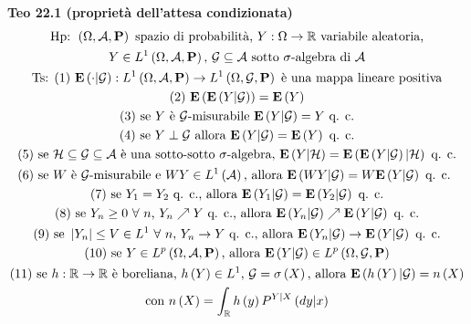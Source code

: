 \documentclass{article}
\begin{document}
\textbf{Teo 22.1 (propriet\`{a} dell'attesa condizionata)}%
\begin{gather*}
\text{Hp: }\left( \Omega ,\mathcal{A},\mathbf{P}\right) \text{ spazio di
probabilit\`{a}, }Y:\Omega \rightarrow 
\mathbb{R}
\text{ variabile aleatoria,} \\
Y\in L^{1}\left( \Omega ,\mathcal{A},\mathbf{P}\right) \text{, }\mathcal{%
G\subseteq A}\text{ sotto }\sigma \text{-algebra di }\mathcal{A} \\
\text{Ts: (1) }\mathbf{E}\left( \cdot |\mathcal{G}\right) :L^{1}\left(
\Omega ,\mathcal{A},\mathbf{P}\right) \rightarrow L^{1}\left( \Omega ,%
\mathcal{G},\mathbf{P}\right) \text{ \`{e} una mappa lineare positiva} \\
\text{(2) }\mathbf{E}\left( \mathbf{E}\left( Y|\mathcal{G}\right) \right) =%
\mathbf{E}\left( Y\right) \\
\text{(3) se }Y\text{ \`{e} }\mathcal{G}\text{-misurabile }\mathbf{E}\left(
Y|\mathcal{G}\right) =Y\text{ q. c.} \\
\text{(4) se }Y\perp \mathcal{G}\text{ allora }\mathbf{E}\left( Y|\mathcal{G}%
\right) =\mathbf{E}\left( Y\right) \text{ q. c.} \\
\text{(5) se }\mathcal{H\subseteq G\subseteq A}\text{ \`{e} una sotto-sotto }%
\sigma \text{-algebra, }\mathbf{E}\left( Y|\mathcal{H}\right) =\mathbf{E}%
\left( \mathbf{E}\left( Y|\mathcal{G}\right) |\mathcal{H}\right) \text{ q. c.%
} \\
\text{(6) se }W\text{ \`{e} }\mathcal{G}\text{-misurabile e }WY\in
L^{1}\left( \mathcal{A}\right) \text{, allora }\mathbf{E}\left( WY|\mathcal{G%
}\right) =W\mathbf{E}\left( Y|\mathcal{G}\right) \text{ q. c. } \\
\text{(7) se }Y_{1}=Y_{2}\text{ q. c., allora }\mathbf{E}\left( Y_{1}|%
\mathcal{G}\right) =\mathbf{E}\left( Y_{2}|\mathcal{G}\right) \text{ q. c.}
\\
\text{(8) se }Y_{n}\geq 0\text{ }\forall \text{ }n\text{, }Y_{n}\nearrow Y%
\text{ q. c., allora }\mathbf{E}\left( Y_{n}|\mathcal{G}\right) \nearrow 
\mathbf{E}\left( Y|\mathcal{G}\right) \text{ q. c.} \\
\text{(9) se }\left\vert Y_{n}\right\vert \leq V\in L^{1}\text{ }\forall 
\text{ }n\text{, }Y_{n}\rightarrow Y\text{ q. c., allora }\mathbf{E}\left(
Y_{n}|\mathcal{G}\right) \rightarrow \mathbf{E}\left( Y|\mathcal{G}\right) 
\text{ q. c.} \\
\text{(10) se }Y\in L^{p}\left( \Omega ,\mathcal{A},\mathbf{P}\right) \text{%
, allora }\mathbf{E}\left( Y|\mathcal{G}\right) \in L^{p}\left( \Omega ,%
\mathcal{G},\mathbf{P}\right) \\
\text{(11) se }h:%
\mathbb{R}
\rightarrow 
\mathbb{R}
\text{ \`{e} boreliana, }h\left( Y\right) \in L^{1}\text{, }\mathcal{G}%
=\sigma \left( X\right) \text{, allora }\mathbf{E}\left( h\left( Y\right) |%
\mathcal{G}\right) =n\left( X\right) \\
\text{con }n\left( X\right) =\int_{%
\mathbb{R}
}h\left( y\right) P^{Y|X}\left( dy|x\right)
\end{gather*}
\end{document}
